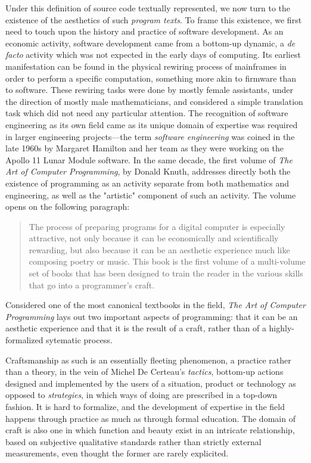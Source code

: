 Under this definition of source code textually represented, we now turn to the existence of the aesthetics of such \emph{program texts}. To frame this existence, we first need to touch upon the history and practice of software development. As an economic activity, software development came from a bottom-up dynamic, a \emph{de facto} activity which was not expected in the early days of computing. Its earliest manifestation can be found in the physical rewiring process of mainframes in order to perform a specific computation, something more akin to firmware than to software. These rewiring tasks were done by mostly female assistants, under the direction of mostly male mathematicians\cite{chun_software_2005}, and considered a simple translation task which did not need any particular attention. The recognition of software engineering as its own field came as its unique domain of expertise was required in larger engineering projects—the term \emph{software engineering} was coined in the late 1960s by Margaret Hamilton and her team as they were working on the Apollo 11 Lunar Module software\cite{mindell_digital_2011}. In the same decade, the first volume of \emph{The Art of Computer Programming}, by Donald Knuth, addresses directly both the existence of programming as an activity separate from both mathematics and engineering, as well as the "artistic" component of such an activity\cite{knuth_art_1997}. The volume opens on the following paragraph:

\begin{quote}
    The process of preparing programs for a digital computer is especially attractive, not only because it can be economically and scientifically rewarding, but also because it can be an aesthetic experience much like composing poetry or music. This book is the first volume of a multi-volume set of books that has been designed to train the reader in the various skills that go into a programmer's craft.\cite{knuth_art_1997}
\end{quote}

Considered one of the most canonical textbooks in the field, \emph{The Art of Computer Programming} lays out two important aspects of programming: that it can be an aesthetic experience and that it is the result of a craft, rather than of a highly-formalized sytematic process.

Craftsmanship as such is an essentially fleeting phenomenon, a practice rather than a theory, in the vein of Michel De Certeau's \textit{tactics}, bottom-up actions designed and implemented by the users of a situation, product or technology as opposed to \textit{strategies}\cite{certeau_invention_1990}, in which ways of doing are prescribed in a top-down fashion. It is hard to formalize, and the development of expertise in the field happens through practice as much as through formal education\cite{sennett_craftsman_2009}. The domain of craft is also one in which function and beauty exist in an intricate relationship, based on subjective qualitative standards rather than strictly external measurements, even thought the former are rarely explicited\cite{pye_nature_2008}.

